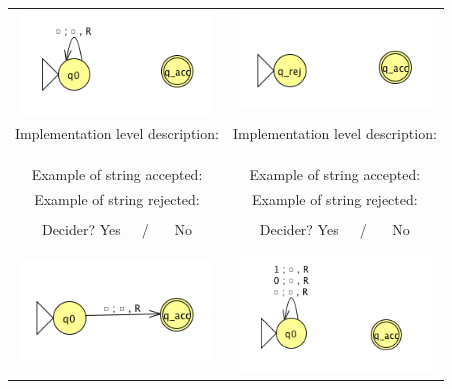 \documentclass[12pt, oneside]{article}
\begin{document}
  
  \begin{center}
  \begin{tabular}{|c|c|}
  \hline
  \hspace{0.8in}\includegraphics[width=2in]{resources/machines/Lect14TM1.png} \phantom{\hspace{0.8in}}&\hspace{0.8in} \includegraphics[width=2in]{resources/machines/Lect14TM2.png} \phantom{\hspace{0.8in}}\\
  Implementation  level description:  \phantom{\hspace{1in}} &Implementation  level description:  \phantom{\hspace{1in}} \\
  &\\
  &\\
  &\\
  Example of string accepted: \phantom{\hspace{1.5in}}& Example of string accepted: \phantom{\hspace{1.5in}}\\
  Example of string rejected: \phantom{\hspace{1.5in}}& Example of string  rejected: \phantom{\hspace{1.5in}}\\
  &\\
  Decider? Yes~~~/ ~~~No
  &Decider? Yes~~~/ ~~~No\\
  & \\
  \hline
  \includegraphics[width=2in]{resources/machines/Lect14TM3.png} & \includegraphics[width=2in]{resources/machines/Lect14TM4.png} \\

\end{tabular}
\end{center}
\end{document}

